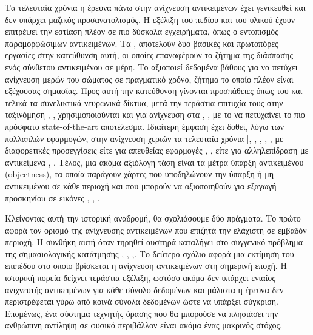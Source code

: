 \documentclass[11pt,a4paper,english,greek,twoside]{../Thesis}
\begin{document}
\par Τα τελευταία χρόνια η έρευνα πάνω στην ανίχνευση αντικειμένων έχει γενικευθεί και δεν υπάρχει μαζικός προσανατολισμός. Η εξέλιξη του πεδίου και του υλικού έχουν επιτρέψει την εστίαση πλέον σε πιο δύσκολα εγχειρήματα, όπως ο εντοπισμός παραμορφώσιμων αντικειμένων. Τα \cite{felzenszwalb_2008}, \cite{felzenszwalb_2010} αποτελούν δύο βασικές και πρωτοπόρες εργασίες στην κατεύθυνση αυτή, οι οποίες επαναφέρουν το ζήτημα της διάσπασης ενός σύνθετου αντικειμένου σε μέρη. Το \cite{plagemann_2010} αξιοποιεί δεδομένα βάθους για να πετύχει ανίχνευση μερών του σώματος σε πραγματικό χρόνο, ζήτημα το οποίο πλέον είναι εξέχουσας σημασίας. Προς αυτή την κατεύθυνση γίνονται προσπάθειες όπως του \cite{dean_2013} και τελικά τα συνελικτικά νευρωνικά δίκτυα, μετά την τεράστια επιτυχία τους στην ταξινόμηση \cite{alexnet_2012}, \cite{he_2015}, χρησιμοποιούνται και για ανίχνευση στα \cite{redmon_2015}, \cite{girshick_2015}, με το \cite{huang_2017_state} να πετυχαίνει το πιο πρόσφατο state-of-the-art αποτέλεσμα. Ιδιαίτερη έμφαση έχει δοθεί, λόγω των πολλαπλών εφαρμογών, στην ανίχνευση χεριών τα τελευταία χρόνια \cite{mittal_2011}], \cite{raheja_2011}, \cite{zhu_2014b}, \cite{zhu_2016}, \cite{grzejszczak_2015}, με διαφορετικές προσεγγίσεις είτε για απευθείας εφαρμογές \cite{fratric_2009}, \cite{dawod_2016}, είτε για αλληλεπίδραση με αντικείμενα \cite{kang_2016}, \cite{rosenfeld_ullman_2016}. Τέλος, μια ακόμα αξιόλογη τάση είναι τα μέτρα ύπαρξη αντικειμένου (objectness), τα οποία παράγουν χάρτες που υποδηλώνουν την ύπαρξη ή μη αντικειμένου σε κάθε περιοχή \cite{cheng_2014} και που μπορούν να αξιοποιηθούν για εξαγωγή προσκηνίου σε εικόνες \cite{rother_2004}, \cite{zhu_2014}, \cite{srivatsa_2015}.

\par Κλείνοντας αυτή την ιστορική αναδρομή, θα σχολιάσουμε δύο πράγματα. Το πρώτο αφορά τον ορισμό της ανίχνευσης αντικειμένων που επιζητά την ελάχιστη σε εμβαδόν περιοχή. Η συνθήκη αυτή όταν τηρηθεί αυστηρά καταλήγει στο συγγενικό πρόβλημα της σημασιολογικής κατάτμησης \cite{tighe_2010}, \cite{li_2013}, \cite{zheng_2015},\cite{long_2016}. Το δεύτερο σχόλιο αφορά μια εκτίμηση του επιπέδου στο οποίο βρίσκεται η ανίχνευση αντικειμένων στη σημερινή εποχή. Η ιστορική πορεία δείχνει τεράστια εξέλιξη, ωστόσο ακόμα δεν υπάρχει ενιαίος ανιχνευτής αντικειμένων για κάθε σύνολο δεδομένων και μάλιστα η έρευνα δεν περιστρέφεται γύρω από κοινά σύνολα δεδομένων ώστε να υπάρξει σύγκριση. Επομένως, ένα σύστημα τεχνητής όρασης που θα μπορούσε να πλησιάσει την ανθρώπινη αντίληψη σε φυσικό περιβάλλον είναι ακόμα ένας μακρινός στόχος.
\end{document}
